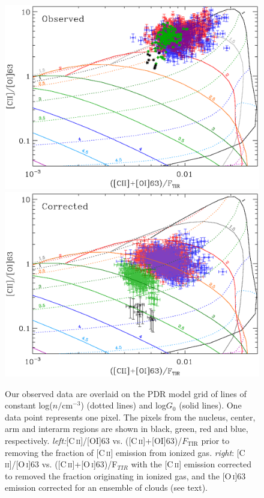 \documentclass[preprint2]{aastex}
\begin{document}
\begin{figure}
 \includegraphics[width=\columnwidth]{Figure7a}
 \includegraphics[width=\columnwidth]{Figure7b}
\caption{Our observed data are overlaid on the PDR model grid of lines of constant log($n/\mathrm{cm}^{-3}$) (dotted lines) and log$G_0$ (solid lines).  One data point represents one pixel.  The pixels from the nucleus, center, arm and interarm regions are shown in black, green, red and blue, respectively.  \emph{left:}[C\,\textsc{ii}]/[OI]63 vs. ([C\,\textsc{ii}]+[OI]63)/$F_{\mathrm{TIR}}$ prior to removing the fraction of [C\,\textsc{ii}] emission from ionized gas. \emph{right}: [C\,\textsc{ii}]/[O\,\textsc{i}]63 vs. ([C\,\textsc{ii}]+[O\,\textsc{i}]63)/F$_{TIR}$ with the [C\,\textsc{ii}] emission corrected to removed the fraction originating in ionized gas, and the [O\,\textsc{i}]63 emission corrected for an ensemble of clouds (see text).}
\label{fig:CIIonOIvsCIIOIonLfir}
\end{figure}
\end{document}
